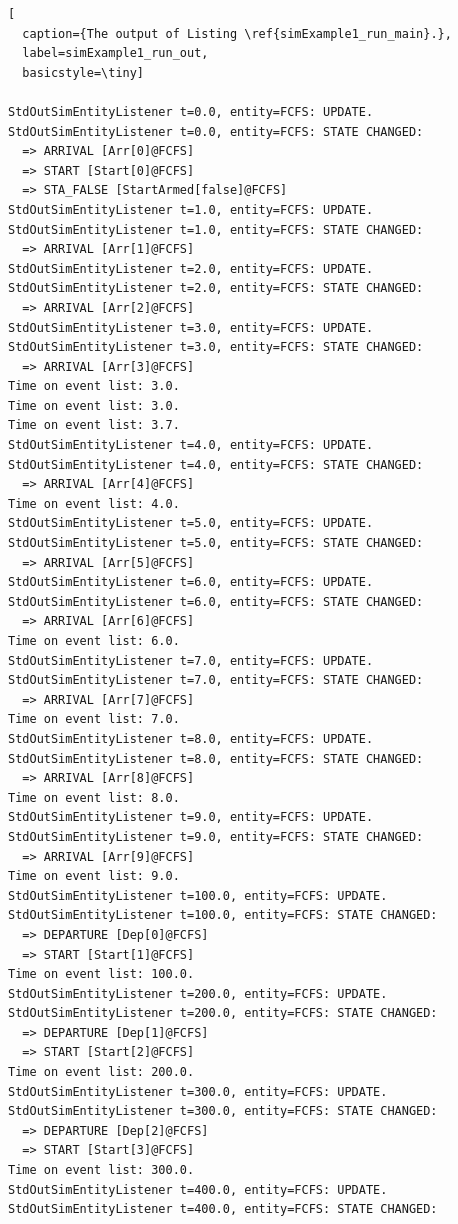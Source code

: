 \documentclass[12pt]{book}
\begin{document}
\begin{lstfloat}
\begin{lstlisting}[
  caption={The output of Listing \ref{simExample1_run_main}.},
  label=simExample1_run_out,
  basicstyle=\tiny]

StdOutSimEntityListener t=0.0, entity=FCFS: UPDATE.
StdOutSimEntityListener t=0.0, entity=FCFS: STATE CHANGED:
  => ARRIVAL [Arr[0]@FCFS]
  => START [Start[0]@FCFS]
  => STA_FALSE [StartArmed[false]@FCFS]
StdOutSimEntityListener t=1.0, entity=FCFS: UPDATE.
StdOutSimEntityListener t=1.0, entity=FCFS: STATE CHANGED:
  => ARRIVAL [Arr[1]@FCFS]
StdOutSimEntityListener t=2.0, entity=FCFS: UPDATE.
StdOutSimEntityListener t=2.0, entity=FCFS: STATE CHANGED:
  => ARRIVAL [Arr[2]@FCFS]
StdOutSimEntityListener t=3.0, entity=FCFS: UPDATE.
StdOutSimEntityListener t=3.0, entity=FCFS: STATE CHANGED:
  => ARRIVAL [Arr[3]@FCFS]
Time on event list: 3.0.
Time on event list: 3.0.
Time on event list: 3.7.
StdOutSimEntityListener t=4.0, entity=FCFS: UPDATE.
StdOutSimEntityListener t=4.0, entity=FCFS: STATE CHANGED:
  => ARRIVAL [Arr[4]@FCFS]
Time on event list: 4.0.
StdOutSimEntityListener t=5.0, entity=FCFS: UPDATE.
StdOutSimEntityListener t=5.0, entity=FCFS: STATE CHANGED:
  => ARRIVAL [Arr[5]@FCFS]
StdOutSimEntityListener t=6.0, entity=FCFS: UPDATE.
StdOutSimEntityListener t=6.0, entity=FCFS: STATE CHANGED:
  => ARRIVAL [Arr[6]@FCFS]
Time on event list: 6.0.
StdOutSimEntityListener t=7.0, entity=FCFS: UPDATE.
StdOutSimEntityListener t=7.0, entity=FCFS: STATE CHANGED:
  => ARRIVAL [Arr[7]@FCFS]
Time on event list: 7.0.
StdOutSimEntityListener t=8.0, entity=FCFS: UPDATE.
StdOutSimEntityListener t=8.0, entity=FCFS: STATE CHANGED:
  => ARRIVAL [Arr[8]@FCFS]
Time on event list: 8.0.
StdOutSimEntityListener t=9.0, entity=FCFS: UPDATE.
StdOutSimEntityListener t=9.0, entity=FCFS: STATE CHANGED:
  => ARRIVAL [Arr[9]@FCFS]
Time on event list: 9.0.
StdOutSimEntityListener t=100.0, entity=FCFS: UPDATE.
StdOutSimEntityListener t=100.0, entity=FCFS: STATE CHANGED:
  => DEPARTURE [Dep[0]@FCFS]
  => START [Start[1]@FCFS]
Time on event list: 100.0.
StdOutSimEntityListener t=200.0, entity=FCFS: UPDATE.
StdOutSimEntityListener t=200.0, entity=FCFS: STATE CHANGED:
  => DEPARTURE [Dep[1]@FCFS]
  => START [Start[2]@FCFS]
Time on event list: 200.0.
StdOutSimEntityListener t=300.0, entity=FCFS: UPDATE.
StdOutSimEntityListener t=300.0, entity=FCFS: STATE CHANGED:
  => DEPARTURE [Dep[2]@FCFS]
  => START [Start[3]@FCFS]
Time on event list: 300.0.
StdOutSimEntityListener t=400.0, entity=FCFS: UPDATE.
StdOutSimEntityListener t=400.0, entity=FCFS: STATE CHANGED:

\end{lstlisting}
\end{lstfloat}
\end{document}
